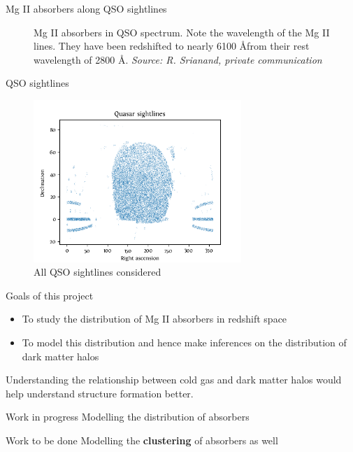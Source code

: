 \documentclass{beamer}
\begin{document}
\begin{frame}[allowframebreaks]{Mg II absorbers along QSO sightlines}
\begin{figure}
				\caption{\tiny Mg II absorbers in QSO spectrum. Note the wavelength of the Mg II lines. They have been redshifted to nearly 6100 \AA from their rest wavelength of 2800 \AA. \emph{Source: R. Srianand, private communication}}
			\end{figure}
		\end{frame}
		\begin{frame}{QSO sightlines}
			\begin{figure}
				\includegraphics[width=0.7\textwidth]{qso_sky.png}
				\caption{\tiny All QSO sightlines considered}
				\label{fig:QSOs}
			\end{figure}
		\end{frame}
		\begin{frame}{Goals of this project}
			\begin{itemize}
				\item To study the distribution of Mg II absorbers in redshift space
				\item To model this distribution and hence make inferences on the distribution of dark matter halos
			\end{itemize}
			Understanding the relationship between cold gas and dark matter halos would help understand structure formation better.
			\begin{block}{Work in progress}
				Modelling the distribution of absorbers
			\end{block}
			\begin{block}{Work to be done}
				Modelling the \textbf{clustering} of absorbers as well
			\end{block}
		\end{frame}
\end{document}
